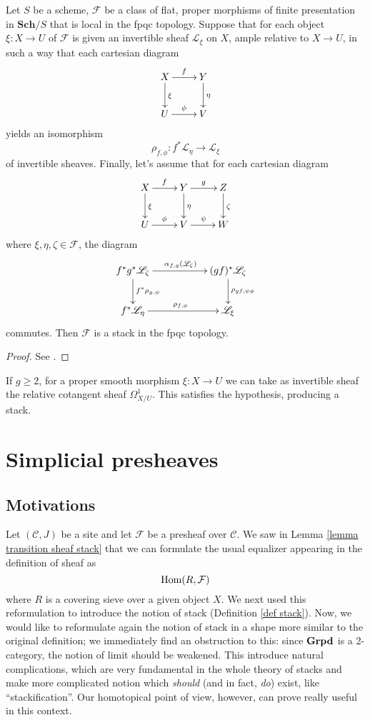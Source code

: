 \begin{refsection}
\begin{thm}
Let $S$ be a scheme, $\mathcal F$ be a class of flat, proper morphisms of finite presentation in $\mathbf{Sch}/S$ that is local in the fpqc topology. Suppose that for each object $\xi \colon X \to U$ of $\mathcal F$ is given an invertible sheaf $\mathscr L_\xi$ on $X$, ample relative to $X \to U$, in such a way that each cartesian diagram
\[
\xymatrix{
X \ar[r]^f \ar[d]^\xi & Y \ar[d]^\eta \\ U \ar[r]^\phi & V
}
\]
yields an isomorphism
\[
\rho_{f,\phi} \colon f^* \mathscr L_\eta \to \mathscr L_\xi
\]
of invertible sheaves. Finally, let's assume that for each cartesian diagram
\[
\xymatrix{
X \ar[r]^f \ar[d]^\xi & Y \ar[r]^g \ar[d]^\eta & Z \ar[d]^\zeta \\ U \ar[r]^\phi & V \ar[r]^\psi & W
}
\]
where $\xi,\eta,\zeta \in \mathcal F$, the diagram
\[
\xymatrix{
f^* g^* \mathscr L_\zeta \ar[rr]^{\alpha_{f,g}(\mathscr L_\zeta)} \ar[d]^{f^* \rho_{g,\psi}} & & (gf)^* \mathscr L_\zeta \ar[d]^{\rho_{gf,\psi\phi}} \\ f^* \mathscr L_\eta \ar[rr]^{\rho_{f,\phi}} & & \mathscr L_\xi
}
\]
commutes. Then $\mathcal F$ is a stack in the fpqc topology.
\end{thm}

\begin{proof}
See \cite[Thm. 4.38]{vistoli}.
\end{proof}

If $g \ge 2$, for a proper smooth morphism $\xi \colon X \to U$ we can take as invertible sheaf the relative cotangent sheaf $\Omega^1_{X/U}$. This satisfies the hypothesis, producing a stack.

\section{Simplicial presheaves}

\subsection{Motivations}

Let $(\mathcal C,J)$ be a site and let $\mathcal F$ be a presheaf over $\mathcal C$. We saw in Lemma \ref{lemma transition sheaf stack} that we can formulate the usual equalizer appearing in the definition of sheaf as
\[
\mathrm{Hom}(R,\mathcal F)
\]
where $R$ is a covering sieve over a given object $X$. We next used this reformulation to introduce the notion of stack (Definition \ref{def stack}). Now, we would like to reformulate again the notion of stack in a shape more similar to the original definition; we immediately find an obstruction to this: since $\mathbf{Grpd}$ is a 2-category, the notion of limit should be weakened. This introduce natural complications, which are very fundamental in the whole theory of stacks and make more complicated notion which \emph{should} (and in fact, \emph{do}) exist, like ``stackification''. Our homotopical point of view, however, can prove really useful in this context.


\end{refsection}
